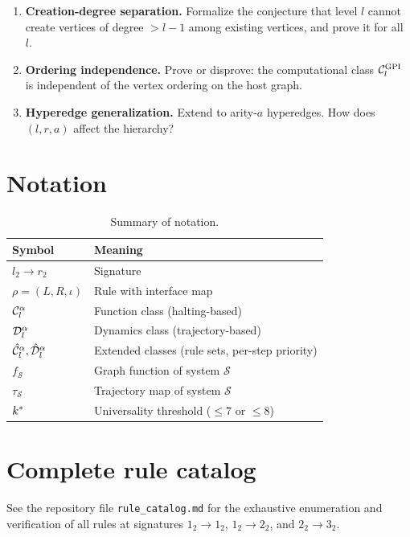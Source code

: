 \documentclass{../shared/primo}
\begin{document}
\begin{enumerate}
\item \textbf{Creation-degree separation.} Formalize the conjecture that level $l$ cannot create vertices of degree $> l-1$ among existing vertices, and prove it for all~$l$.

\item \textbf{Ordering independence.} Prove or disprove: the computational class $\mathcal{C}_{l}^{\text{GPI}}$ is independent of the vertex ordering on the host graph.

\item \textbf{Hyperedge generalization.} Extend to arity-$a$ hyperedges. How does $(l, r, a)$ affect the hierarchy?
\end{enumerate}


\appendix

\section{Notation}
\label{app:notation}

\begin{table}[ht]
\centering
\begin{tabular}{ll}
\toprule
Symbol & Meaning \\
\midrule
$l_2 \to r_2$ & Signature \\
$\rho = (L, R, \iota)$ & Rule with interface map \\
$\mathcal{C}_{l}^{\alpha}$ & Function class (halting-based) \\
$\mathcal{D}_{l}^{\alpha}$ & Dynamics class (trajectory-based) \\
$\hat{\mathcal{C}}_{l}^{\alpha}, \hat{\mathcal{D}}_{l}^{\alpha}$ & Extended classes (rule sets, per-step priority) \\
$f_{\mathcal{S}}$ & Graph function of system $\mathcal{S}$ \\
$\tau_{\mathcal{S}}$ & Trajectory map of system $\mathcal{S}$ \\
$k^*$ & Universality threshold ($\leq 7$ or $\leq 8$) \\
\bottomrule
\end{tabular}
\caption{Summary of notation.}
\label{tab:notation}
\end{table}

\section{Complete rule catalog}
\label{app:catalog}

See the repository file \texttt{rule\_catalog.md} for the exhaustive enumeration and verification of all rules at signatures $1_2 \to 1_2$, $1_2 \to 2_2$, and $2_2 \to 3_2$.
\end{document}
